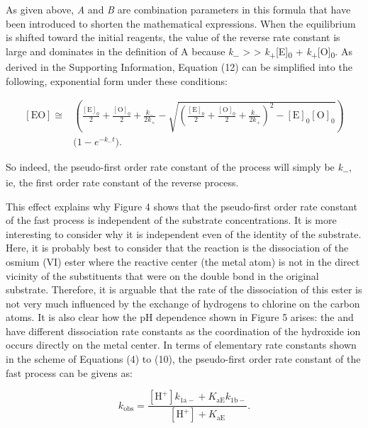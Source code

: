 \documentclass{article}
\begin{document}
As given above, \emph{A} and \emph{B} are combination parameters in this formula that have been introduced to shorten the mathematical expressions. When the equilibrium is shifted toward the initial reagents, the value of the reverse rate constant is large and dominates in the definition of A because \emph{k}\textsubscript{−} > > \emph{k}\textsubscript{+}[E]\textsubscript{0} + \emph{k}\textsubscript{+}[O]\textsubscript{0}. As derived in the Supporting Information, Equation (12) can be simplified into the following, exponential form under these conditions:

\begin{equation}
\begin{split}
[\mathrm{EO}] \cong {} & \left(\frac{[\mathrm{E}]_0}{2} + \frac{[\mathrm{O}]_0}{2} + \frac{k_-}{2k_+} - \sqrt{\left(\frac{[\mathrm{E}]_0}{2} + \frac{[\mathrm{O}]_0}{2} + \frac{k_-}{2k_+}\right)^2 - [\mathrm{E}]_0[\mathrm{O}]_0}\right)\\
& \bigl(1 - e^{-k_-t}\bigr).
\end{split} \tag{13}
\end{equation}

So indeed, the pseudo-first order rate constant of the process will simply be \emph{k}\textsubscript{−}, ie, the first order rate constant of the reverse process.

This effect explains why Figure 4 shows that the pseudo-first order rate constant of the fast process is independent of the substrate concentrations. It is more interesting to consider why it is independent even of the identity of the substrate. Here, it is probably best to consider that the reaction is the dissociation of the osmium (VI) ester where the reactive center (the metal atom) is not in the direct vicinity of the substituents that were on the double bond in the original substrate. Therefore, it is arguable that the rate of the dissociation of this ester is not very much influenced by the exchange of hydrogens to chlorine on the carbon atoms. It is also clear how the pH dependence shown in Figure 5 arises: the  and  have different dissociation rate constants as the coordination of the hydroxide ion occurs directly on the metal center. In terms of elementary rate constants shown in the scheme of Equations (4) to (10), the pseudo-first order rate constant of the fast process can be givens as:

\begin{equation}
k_{\mathrm{obs}} = \frac{[\mathrm{H}^+]k_{\mathrm{1a-}} + K_{\mathrm{aE}}k_{\mathrm{1b-}}}{[\mathrm{H}^+] + K_{\mathrm{aE}}}. \tag{14}
\end{equation}
\end{document}

